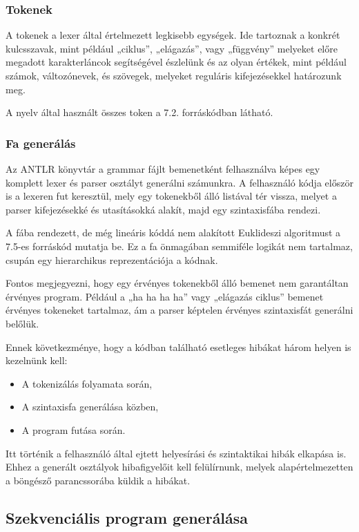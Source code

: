 \subsubsection{Tokenek}

A tokenek a lexer által értelmezett legkisebb egységek. Ide tartoznak a konkrét kulcsszavak, mint például „ciklus”, „elágazás”, vagy „függvény” melyeket előre megadott karakterláncok segítségével észlelünk és az olyan értékek, mint például számok, változónevek, és szövegek, melyeket reguláris kifejezésekkel határozunk meg.

A nyelv által használt összes token a 7.2. forráskódban látható.

\subsubsection{Fa generálás}

Az ANTLR könyvtár a grammar fájlt bemenetként felhasználva képes egy komplett lexer és parser osztályt generálni számunkra. A felhasználó kódja először is a lexeren fut keresztül, mely egy tokenekből álló listával tér vissza, melyet a parser kifejezésekké és utasításokká alakít, majd egy szintaxisfába rendezi.

A fába rendezett, de még lineáris kóddá nem alakított Euklideszi algoritmust a 7.5-es forráskód mutatja be. Ez a fa önmagában semmiféle logikát nem tartalmaz, csupán egy hierarchikus reprezentációja a kódnak.

Fontos megjegyezni, hogy egy érvényes tokenekből álló bemenet nem garantáltan érvényes program. Például a „ha ha ha ha” vagy „elágazás ciklus” bemenet érvényes tokeneket tartalmaz, ám a parser képtelen érvényes szintaxisfát generálni belőlük.

Ennek következménye, hogy a kódban található esetleges hibákat három helyen is kezelnünk kell:

\begin{itemize}
    \item A tokenizálás folyamata során,
    \item A szintaxisfa generálása közben,
    \item A program futása során.
\end{itemize}

Itt történik a felhasználó által ejtett helyesírási és szintaktikai hibák elkapása is. Ehhez a generált osztályok hibafigyelőit kell felülírnunk, melyek alapértelmezetten a böngésző parancssorába küldik a hibákat.

\subsection{Szekvenciális program generálása}

